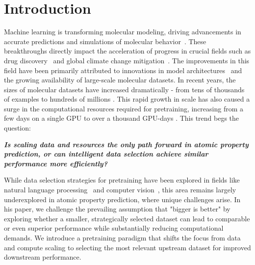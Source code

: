 \section{Introduction}
 
Machine learning is transforming molecular modeling, driving advancements in accurate predictions and simulations of molecular behavior~\cite{chanussot2021open, tran2023open, liaoequiformerv2}. These breakthroughs directly impact the acceleration of progress in crucial fields such as drug discovery~\cite{huang2021therapeutics} and global climate change mitigation~\cite{sriram2024open}. The improvements in this field have been primarily attributed to innovations in model architectures~\cite{liaoequiformerv2, gasteiger2021gemnet, passaro2023reducing} and the growing availability of large-scale molecular datasets. In recent years, the sizes of molecular datasets have increased dramatically - from tens of thousands of examples \cite{christensen2020role, chmiela2023accurate, wu2018moleculenet} to hundreds of millions \cite{chanussot2021open, tran2023open}. This rapid growth in scale has also caused a surge in the computational resources required for pretraining, increasing from a few days on a single GPU to over a thousand GPU-days \cite{shoghimolecules, liaoequiformerv2}. This trend begs the question: 

\textit{\textcolor{darkyellow}{\faLightbulb} {\textbf{Is scaling data and resources the only path forward in atomic property prediction, or can intelligent data selection achieve similar performance more efficiently?}}}



While data selection strategies for pretraining have been explored in fields like natural language processing~\cite{penedo2024the} and computer vision~\cite{hammoud2024pretraining,li2023internet}, this area remains largely underexplored in atomic property prediction, where unique challenges arise. In his paper, we challenge the prevailing assumption that "bigger is better" by exploring whether a smaller, strategically selected dataset can lead to comparable or even superior performance while substantially reducing computational demands. We introduce a pretraining paradigm that shifts the focus from data and compute scaling to selecting the most relevant upstream dataset for improved downstream performance.\newline


